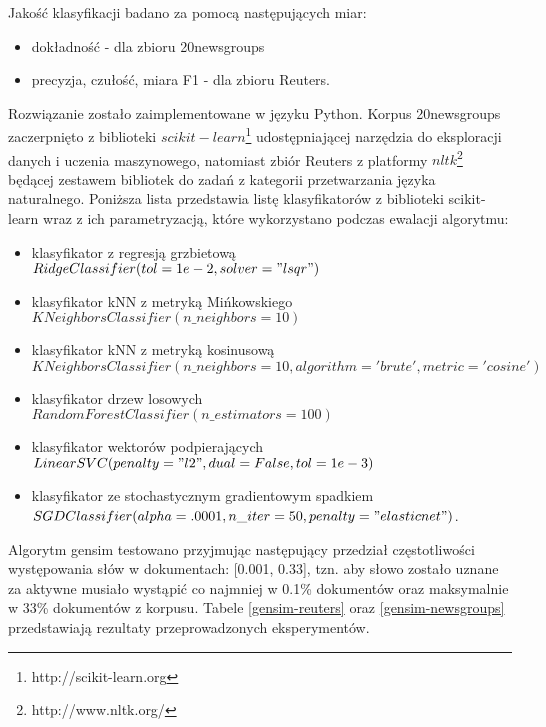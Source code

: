 \documentclass{pracamgr}
\begin{document}
Jakość klasyfikacji badano za pomocą następujących miar:

\begin{itemize}
    \item dokładność - dla zbioru 20newsgroups
    \item precyzja, czułość, miara F1 - dla zbioru Reuters.
\end{itemize}

Rozwiązanie zostało zaimplementowane w języku Python. Korpus 20newsgroups zaczerpnięto z biblioteki $scikit-learn$\footnote{http://scikit-learn.org} udostępniającej narzędzia do eksploracji danych i uczenia maszynowego, natomiast zbiór Reuters z platformy $nltk$\footnote{http://www.nltk.org/} będącej zestawem bibliotek do zadań z kategorii przetwarzania języka naturalnego. Poniższa lista przedstawia listę klasyfikatorów z biblioteki scikit-learn wraz z ich parametryzacją, które wykorzystano podczas ewalacji algorytmu:

\begin{itemize}
    \item klasyfikator z regresją grzbietową\\ $RidgeClassifier(tol=1e-2, solver="lsqr")$
    \item klasyfikator kNN z metryką Mińkowskiego\\ $KNeighborsClassifier(n\_neighbors=10)$
    \item klasyfikator kNN z metryką kosinusową\\
    $KNeighborsClassifier(n\_neighbors=10, algorithm='brute', metric='cosine')$
    \item klasyfikator drzew losowych\\ $RandomForestClassifier(n\_estimators=100)$
    \item klasyfikator wektorów podpierających\\ $LinearSVC(penalty="l2", dual=False, tol=1e-3)$
    \item klasyfikator ze stochastycznym gradientowym spadkiem\\ $SGDClassifier(alpha=.0001, n\_iter=50, penalty="elasticnet")$.
\end{itemize}

Algorytm gensim testowano przyjmując następujący przedział częstotliwości występowania słów w dokumentach: [0.001, 0.33], tzn. aby słowo zostało uznane za aktywne musiało wystąpić co najmniej w 0.1\% dokumentów oraz maksymalnie w 33\% dokumentów z korpusu. Tabele \ref{gensim-reuters} oraz \ref{gensim-newsgroups} przedstawiają rezultaty przeprowadzonych eksperymentów.
\end{document}
